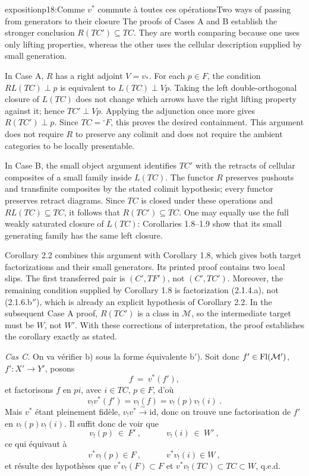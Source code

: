 \begin{dcomment}{exposition}{p18:Comme $v^*$ commute à toutes ces opérations}{Two ways of passing from generators to their closure}
The proofs of Cases A and B establish the stronger conclusion $R(TC')\subseteq TC$. They are worth comparing because one uses only lifting properties, whereas the other uses the cellular description supplied by small generation.

In Case A, $R$ has a right adjoint $V=v_*$. For each $p\in F$, the condition $RL(TC)\perp p$ is equivalent to $L(TC)\perp Vp$. Taking the left double-orthogonal closure of $L(TC)$ does not change which arrows have the right lifting property against it; hence $TC'\perp Vp$. Applying the adjunction once more gives $R(TC')\perp p$. Since $TC={}^{\square}F$, this proves the desired containment. This argument does not require $R$ to preserve any colimit and does not require the ambient categories to be locally presentable.

In Case B, the small object argument identifies $TC'$ with the retracts of cellular composites of a small family inside $L(TC)$. The functor $R$ preserves pushouts and transfinite composites by the stated colimit hypothesis; every functor preserves retract diagrams. Since $TC$ is closed under these operations and $RL(TC)\subseteq TC$, it follows that $R(TC')\subseteq TC$. One may equally use the full weakly saturated closure of $L(TC)$: Corollaries 1.8--1.9 show that its small generating family has the same left closure.

Corollary 2.2 combines this argument with Corollary 1.8, which gives both target factorizations and their small generators. Its printed proof contains two local slips. The first transferred pair is $(C',TF')$, not $(C',TC')$. Moreover, the remaining condition supplied by Corollary 1.8 is factorization (2.1.4.a), not (2.1.6.b$''$), which is already an explicit hypothesis of Corollary 2.2. In the subsequent Case A proof, $R(TC')$ is a class in $\mathcal M$, so the intermediate target must be $W$, not $W'$. With these corrections of interpretation, the proof establishes the corollary exactly as stated.
\end{dcomment}


\textit{Cas C.} On va vérifier b) sous la forme équivalente b$'$). Soit donc $f' \in \mathrm{Fl}(\mathcal{M}')$, $f' : X' \longrightarrow Y'$,
posons
\[
f\ =\ v^*(f'),
\]
et factorisons $f$ en $pi$, avec $i \in TC$, $p \in F$, d'où
\[
v_!v^*(f') = v_!(f) = v_!(p)v_!(i)\ .
\]
Mais $v^*$ étant pleinement fidèle, $v_!v^* \xrightarrow{\ \sim\ } \mathrm{id}$, donc on trouve une factorisation de $f'$ en $v_!(p)v_!(i)$. Il suffit donc de voir que
\[
v_!(p)\ \in\ F'\ ,\qquad\quad v_!(i)\ \in\ W'\ ,
\]
ce qui équivaut à
\[
v^*v_!(p) \in F\ ,\qquad\quad v^*v_!(i) \in W\ ,
\]
et résulte des hypothèses que $v^*v_!(F) \subset F$ et $v^*v_!(TC) \subset TC \subset W$, q.e.d.

